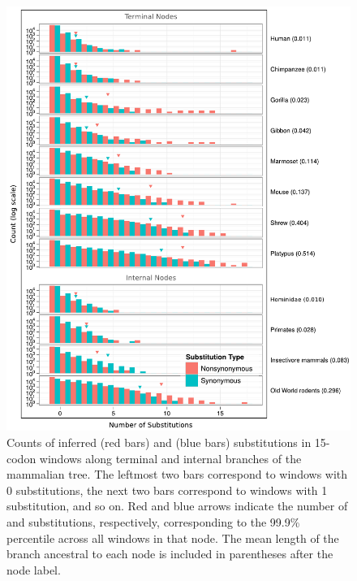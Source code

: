 \begin{figure}
\centering \includegraphics[scale=0.75]{Figs/wcs_15.pdf}
\caption{Counts of inferred \nsyn (red bars) and \syn (blue bars)
  substitutions in 15-codon windows along terminal and internal
  branches of the mammalian tree. The leftmost two bars correspond to
  windows with 0 substitutions, the next two bars correspond to
  windows with 1 substitution, and so on. Red and blue arrows indicate
  the number of \nsyn and \syn substitutions, respectively,
  corresponding to the 99.9\% percentile across all windows in that
  node. The mean length of the branch ancestral to each node is
  included in parentheses after the node label.}
\label{fig_wcs}
\end{figure}

